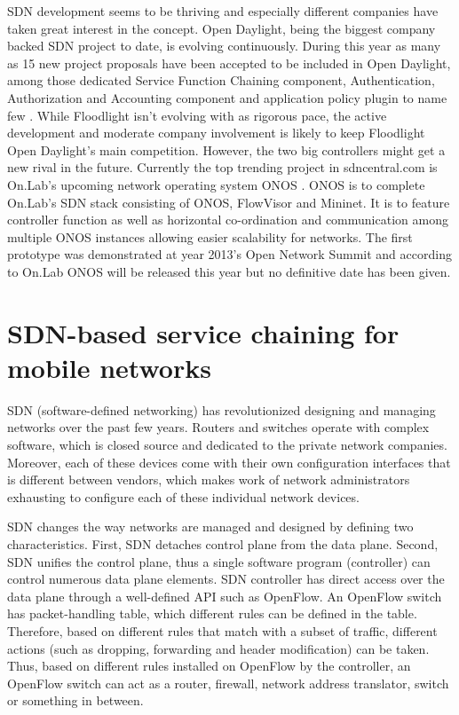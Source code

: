 \documentclass[english]{tktltiki2}
\theoremstyle{definition}
\theoremstyle{remark}
\begin{document}
SDN development seems to be thriving and especially different companies have taken great interest in the concept. Open Daylight, being the biggest company backed SDN project to date, is evolving continuously. During this year as many as 15 new project proposals have been accepted to be included in Open Daylight, among those dedicated Service Function Chaining component, Authentication, Authorization and Accounting component and application policy plugin to name few \cite{projects}. While Floodlight isn't evolving with as rigorous pace, the active development and moderate company involvement is likely to keep Floodlight Open Daylight's main competition. However, the two big controllers might get a new rival in the future. Currently the top trending project in sdncentral.com is On.Lab's upcoming network operating system ONOS \cite{SDNCentral, ONOS}. ONOS is to complete On.Lab's SDN stack consisting of ONOS, FlowVisor and Mininet. It is to feature controller function as well as horizontal co-ordination and communication among multiple ONOS instances allowing easier scalability for networks. The first prototype was demonstrated at year 2013's Open Network Summit and according to On.Lab ONOS will be released this year but no definitive date has been given.

\clearpage

\section{SDN-based service chaining for mobile networks}

SDN (software-defined networking) has revolutionized designing and managing networks over the past few years. Routers and switches operate with complex software, which is closed source and dedicated to the private network companies. Moreover, each of these devices come with their own configuration interfaces that is different between vendors, which makes work of network administrators exhausting to configure each of these individual network devices. \cite{FRZ13}

SDN changes the way networks are managed and designed by defining two characteristics. First, SDN detaches control plane from the data plane. Second, SDN unifies the control plane, thus a single software program (controller) can control numerous data plane elements. SDN controller has direct access over the data plane through a well-defined API such as OpenFlow. An OpenFlow switch has packet-handling table, which different rules can be defined in the table. Therefore, based on different rules that match with a subset of traffic, different actions (such as dropping, forwarding and header modification) can be taken. Thus, based on different rules installed on OpenFlow by the controller, an OpenFlow switch can act as a router, firewall, network address translator, switch or something in between. 
\end{document}
